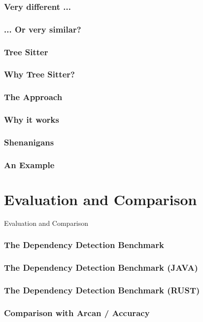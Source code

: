 \documentclass[dvipsnames, 10pt]{beamer}
\begin{document}
\begin{frame}
  \frametitle{Very different ...}
\end{frame}

\begin{frame}
  \frametitle{... Or very similar?}
\end{frame}

\begin{frame}
  \frametitle{Tree Sitter}
\end{frame}

\begin{frame}
  \frametitle{Why Tree Sitter?}
\end{frame}

\begin{frame}
  \frametitle{The Approach}
\end{frame}

\begin{frame}
  \frametitle{Why it works}
\end{frame}

\begin{frame}
  \frametitle{Shenanigans}
\end{frame}

\begin{frame}
  \frametitle{An Example}
\end{frame}

\section{Evaluation and Comparison}
\begin{frame}
  \centering
  \Huge
  Evaluation and Comparison
\end{frame}

\begin{frame}
  \frametitle{The Dependency Detection Benchmark}
\end{frame}

\begin{frame}
  \frametitle{The Dependency Detection Benchmark (JAVA)}
\end{frame}

\begin{frame}
  \frametitle{The Dependency Detection Benchmark (RUST)}
\end{frame}

\begin{frame}
  \frametitle{Comparison with Arcan / Accuracy}
\end{frame}
\end{document}
